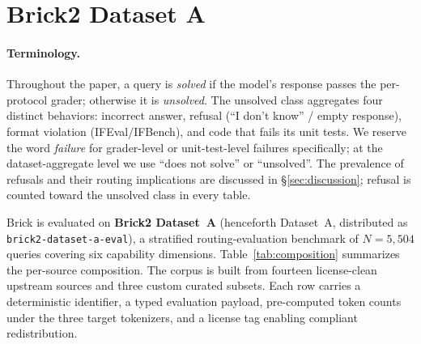 \documentclass[twocolumn,10pt,a4paper]{article}
\begin{document}
\section{Brick2 Dataset A}\label{sec:dataset}

\paragraph{Terminology.} Throughout the paper, a query is \emph{solved} if the model's response passes the per-protocol grader; otherwise it is \emph{unsolved}. The unsolved class aggregates four distinct behaviors: incorrect answer, refusal (``I don't know'' / empty response), format violation (IFEval/IFBench), and code that fails its unit tests. We reserve the word \emph{failure} for grader-level or unit-test-level failures specifically; at the dataset-aggregate level we use ``does not solve'' or ``unsolved''. The prevalence of refusals and their routing implications are discussed in §\ref{sec:discussion}; refusal is counted toward the unsolved class in every table.

Brick is evaluated on \textbf{Brick2 Dataset~A} (henceforth Dataset~A, distributed as \texttt{brick2-dataset-a-eval}), a stratified routing-evaluation benchmark of $N{=}5{,}504$ queries covering six capability dimensions. Table~\ref{tab:composition} summarizes the per-source composition. The corpus is built from fourteen license-clean upstream sources and three custom curated subsets. Each row carries a deterministic identifier, a typed evaluation payload, pre-computed token counts under the three target tokenizers, and a license tag enabling compliant redistribution.
\end{document}
